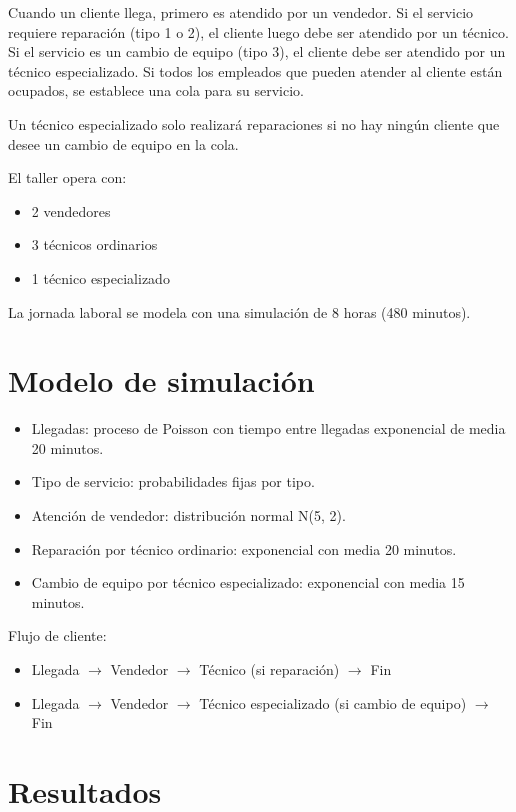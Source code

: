 \documentclass[12pt]{article}
\begin{document}
Cuando un cliente llega, primero es atendido por un vendedor. Si el servicio requiere reparación (tipo 1 o 2), el cliente luego debe ser atendido por un técnico. Si el servicio es un cambio de equipo (tipo 3), el cliente debe ser atendido por un técnico especializado. Si todos los empleados que pueden atender al cliente están ocupados, se establece una cola para su servicio.

Un técnico especializado solo realizará reparaciones si no hay ningún cliente que desee un cambio de equipo en la cola.

El taller opera con:
\begin{itemize}
  \item 2 vendedores
  \item 3 técnicos ordinarios
  \item 1 técnico especializado
\end{itemize}

La jornada laboral se modela con una simulación de 8 horas (480 minutos).

\section{Modelo de simulación}
\begin{itemize}
  \item Llegadas: proceso de Poisson con tiempo entre llegadas exponencial de media 20 minutos.
  \item Tipo de servicio: probabilidades fijas por tipo.
  \item Atención de vendedor: distribución normal N(5, 2).
  \item Reparación por técnico ordinario: exponencial con media 20 minutos.
  \item Cambio de equipo por técnico especializado: exponencial con media 15 minutos.
\end{itemize}

Flujo de cliente:
\begin{itemize}
  \item Llegada $\rightarrow$ Vendedor $\rightarrow$ Técnico (si reparación) $\rightarrow$ Fin
  \item Llegada $\rightarrow$ Vendedor $\rightarrow$ Técnico especializado (si cambio de equipo) $\rightarrow$ Fin
\end{itemize}

\section{Resultados}
\end{document}
